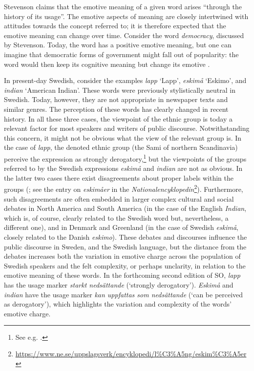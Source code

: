 \documentclass[output=paper]{langscibook}
\begin{document}
Stevenson claims that the emotive meaning of a given word arises ``through the history of its usage''. The emotive aspects of meaning are closely intertwined with attitudes towards the concept referred to; it is therefore expected that the emotive meaning can change over time. Consider the word \emph{democracy}, discussed by Stevenson. Today, the word has a positive emotive meaning, but one can imagine that democratic forms of government might fall out of popularity: the word would then keep its cognitive meaning but change its emotive \citep[72]{stevenson1944}. 

In present-day Swedish, consider the examples \emph{lapp} `Lapp', \emph{eskimå} `Eskimo', and \emph{indian} `American Indian'. These words were previously stylistically neutral in Swedish. Today, however, they are not appropriate in newspaper texts and similar genres. The perception of these words has clearly changed in recent history. In all these three cases, the viewpoint of the ethnic group is today a relevant factor for most speakers and writers of public discourse. Notwithstanding this concern, it might not be obvious what the view of the relevant group is. In the case of \emph{lapp}, the denoted ethnic group (the Sami of northern Scandinavia) perceive the expression as strongly derogatory,\footnote{See e.g. \citet[][5]{Sametinget}.} but the viewpoints of the groups referred to by the Swedish expressions \emph{eskimå} and \emph{indian} are not as obvious. In the latter two cases there exist disagreements about proper labels within the groups (\citealt{Bird1999}; see the entry on \textit{eskimåer} in the \textit{Nationalencyklopedin}\footnote{\url{https://www.ne.se/uppslagsverk/encyklopedi/l\%C3\%A5ng/eskim\%C3\%A5er}}). Furthermore, such disagreements are often embedded in larger complex cultural and social debates in North America and South America (in the case of the English \emph{Indian}, which is, of course, clearly related to the Swedish word but, nevertheless, a different one), and in Denmark and Greenland (in the case of Swedish \emph{eskimå}, closely related to the Danish \emph{eskimo}). These debates and discourses influence the public discourse in Sweden, and the Swedish language, but the distance from the debates increases both the variation in emotive charge across the population of Swedish speakers and the felt complexity, or perhaps unclarity, in relation to the emotive meaning of these words. In the forthcoming second edition of SO, \emph{lapp} has the usage marker \textit{starkt nedsättande} (`strongly derogatory'). \emph{Eskimå} and \emph{indian} have the usage marker \textit{kan uppfattas som nedsättande} (`can be perceived as derogatory'), which highlights the variation and complexity of the words' emotive charge.  
\end{document}
